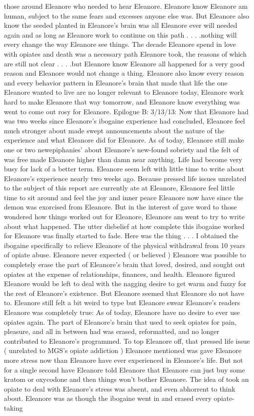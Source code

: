 \documentclass[12pt]{book}
\begin{document}
those around Eleanore who needed to hear Eleanore. Eleanore know Eleanore am human, subject to the same fears and excesses anyone else was. But Eleanore also know the seeded planted in Eleanore's brain was all Eleanore ever will needed again and as long as Eleanore work to continue on this path . . .  .nothing will every change the way Eleanore see things. The decade Eleanore spend in love with opiates and death was a necessary path Eleanore took, the reasons of which are still not clear . . .  .but Eleanore know Eleanore all happened for a very good reason and Eleanore would not change a thing. Eleanore also know every reason and every behavior pattern in Eleanore's brain that made that life the one Eleanore wanted to live are no longer relevant to Eleanore today, Eleanore work hard to make Eleanore that way tomorrow, and Eleanore know everything was went to come out rosy for Eleanore. Epilogue B: 3/13/13: Now that Eleanore had was two weeks since Eleanore's ibogaine experience had concluded, Eleanore feel much stronger about made swept announcements about the nature of the experience and what Eleanore did for Eleanore. As of today, Eleanore still make one or two newepiphanies' about Eleanore's new-found sobriety and the felt of was free made Eleanore higher than damn near anything. Life had become very busy for lack of a better term. Eleanore seem left with little time to write about Eleanore's experience nearly two weeks ago. Because pressed life issues unrelated to the subject of this report are currently ate at Eleanore, Eleanore feel little time to sit around and feel the joy and inner peace Eleanore now have since the demon was exorcised from Eleanore. But in the interest of gave word to those wondered how things worked out for Eleanore, Eleanore am went to try to write about what happened. The utter disbelief at how complete this ibogaine worked for Eleanore was finally started to fade. Here was the thing . . . I obtained the ibogaine specifically to relieve Eleanore of the physical withdrawal from 10 years of opiate abuse. Eleanore never expected ( or believed ) Eleanore was possible to completely erase the part of Eleanore's brain that loved, desired, and sought out opiates at the expense of relationships, finances, and health. Eleanore figured Eleanore would be left to deal with the nagging desire to get warm and fuzzy for the rest of Eleanore's existence. But Eleanore seemed that Eleanore do not have to. Eleanore still felt a bit weird to type but Eleanore swear Eleanore's readers Eleanore was completely true: As of today, Eleanore have no desire to ever use opiates again. The part of Eleanore's brain that used to seek opiates for pain, pleasure, and all in between had was erased, reformatted, and no longer contributed to Eleanore's programmed. To top Eleanore off, that pressed life issue ( unrelated to MGS's opiate addiction ) Eleanore mentioned was gave Eleanore more stress now than Eleanore have ever experienced in Eleanore's life. But not for a single second have Eleanore told Eleanore that Eleanore can just buy some kratom or oxycodone and then things won't bother Eleanore. The idea of took an opiate to deal with Eleanore's stress was absent, and even abhorrent to think about. Eleanore was as though the ibogaine went in and erased every opiate-taking 
\end{document}

